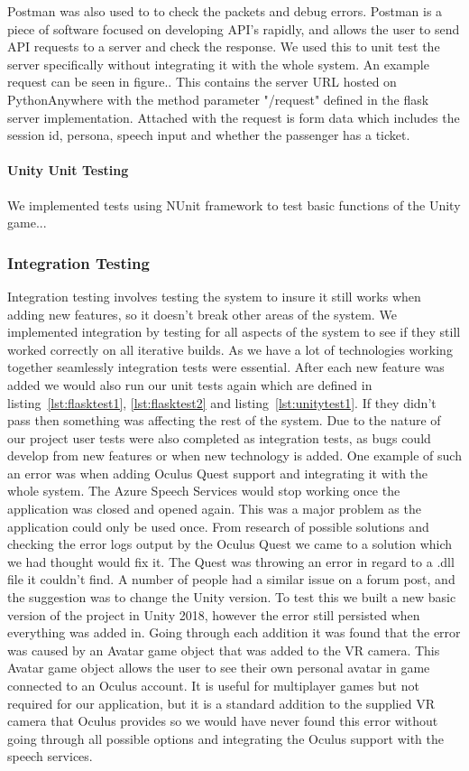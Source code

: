 Postman was also used to to check the packets and debug errors. Postman is a piece of software focused on developing API's rapidly, and allows the user to send API requests to a server and check the response. We used this to unit test the server specifically without integrating it with the whole system. An example request can be seen in figure.. This contains the server URL hosted on PythonAnywhere with the method parameter "/request" defined in the flask server implementation. Attached with the request is form data which includes the session id, persona, speech input and whether the passenger has a ticket.

\paragraph{Unity Unit Testing}
We implemented tests using NUnit framework to test basic functions of the Unity game... 

\subsubsection{Integration Testing}
Integration testing involves testing the system to insure it still works when adding new features, so it doesn't break other areas of the system. We implemented integration by testing for all aspects of the system to see if they still worked correctly on all iterative builds. As we have a lot of technologies working together seamlessly integration tests were essential. After each new feature was added we would also run our unit tests again which are defined in listing~\ref{lst:flasktest1}, \ref{lst:flasktest2} and listing~\ref{lst:unitytest1}. If they didn't pass then something was affecting the rest of the system. Due to the nature of our project user tests were also completed as integration tests, as bugs could develop from new features or when new technology is added. One example of such an error was when adding Oculus Quest support and integrating it with the whole system. The Azure Speech Services would stop working once the application was closed and opened again. This was a major problem as the application could only be used once. From research of possible solutions and checking the error logs output by the Oculus Quest we came to a solution which we had thought would fix it. The Quest was throwing an error in regard to a .dll file it couldn't find. A number of people had a similar issue on a forum post, and the suggestion was to change the Unity version. To test this we built a new basic version of the project in Unity 2018, however the error still persisted when everything was added in. Going through each addition it was found that the error was caused by an Avatar game object that was added to the VR camera. This Avatar game object allows the user to see their own personal avatar in game connected to an Oculus account. It is useful for multiplayer games but not required for our application, but it is a standard addition to the supplied VR camera that Oculus provides so we would have never found this error without going through all possible options and integrating the Oculus support with the speech services.

